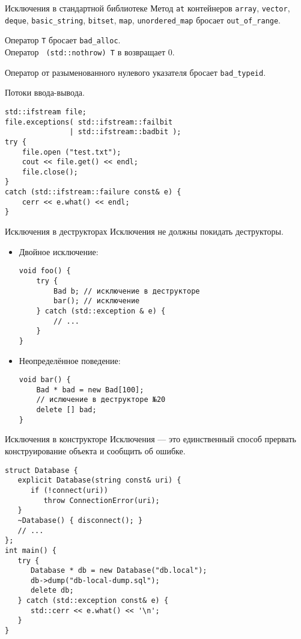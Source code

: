 \documentclass{beamer}
\begin{document}
\begin{frame}[fragile]{Исключения в стандартной библиотеке}
\small
        \fakeitem Метод \texttt{at} контейнеров {\tt array}, {\tt vector}, {\tt deque}, {\tt basic\_string}, {\tt bitset}, {\tt map}, {\tt unordered\_map} бросает {\tt out\_of\_range}.

        \fakeitem Оператор  {\tt T} бросает {\tt bad\_alloc}.\\
            Оператор {\tt {} (std::nothrow) T} в возвращает 0.
            
        \fakeitem Оператор  от разыменованного нулевого указателя бросает {\tt bad\_typeid}.

        \fakeitem Потоки ввода-вывода. 
            \begin{lstlisting}
std::ifstream file;
file.exceptions( std::ifstream::failbit 
               | std::ifstream::badbit );
try {
    file.open ("test.txt");
    cout << file.get() << endl;
    file.close();
}
catch (std::ifstream::failure const& e) {
    cerr << e.what() << endl;
}
            \end{lstlisting}
\end{frame}


\begin{frame}[fragile]{Исключения в деструкторах}
Исключения не должны покидать деструкторы.
\begin{itemize}
\item Двойное исключение:
\begin{lstlisting}
void foo() {
    try {
        Bad b; // исключение в деструкторе
        bar(); // исключение
    } catch (std::exception & e) {
        // ...
    }
}
\end{lstlisting}
\item Неопределённое поведение:
\begin{lstlisting}
void bar() {
    Bad * bad = new Bad[100];
    // ислючение в деструкторе №20
    delete [] bad;
}
\end{lstlisting}
\end{itemize}
\end{frame}

\begin{frame}[fragile]{Исключения в конструкторе}
Исключения — это единственный способ
прервать  конструирование объекта и сообщить об ошибке.

\begin{lstlisting}
struct Database {
   explicit Database(string const& uri) {
      if (!connect(uri))
         throw ConnectionError(uri);
   }
   ~Database() { disconnect(); }
   // ...
};
int main() {
   try {
      Database * db = new Database("db.local");
      db->dump("db-local-dump.sql");
      delete db;
   } catch (std::exception const& e) {
      std::cerr << e.what() << '\n';
   }
}

\end{lstlisting}
\end{frame}
\end{document}
